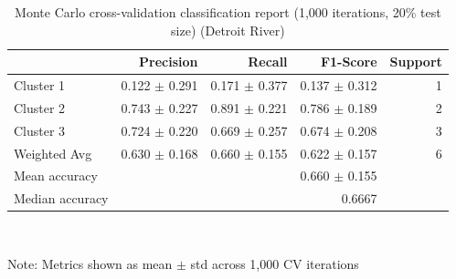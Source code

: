 \begin{table}[htbp]
  \centering
  \caption{Monte Carlo cross-validation classification report (1,000 iterations, 20\% test size) (Detroit River)}
  \label{tab:dr_03_LDA_Classification_mccv_classification_report}
  \begin{tabular}{lrrrr}
    \toprule
     & Precision & Recall & F1-Score & Support \\
    \midrule
    Cluster 1 & 0.122 $\pm$ 0.291 & 0.171 $\pm$ 0.377 & 0.137 $\pm$ 0.312 & 1 \\
    Cluster 2 & 0.743 $\pm$ 0.227 & 0.891 $\pm$ 0.221 & 0.786 $\pm$ 0.189 & 2 \\
    Cluster 3 & 0.724 $\pm$ 0.220 & 0.669 $\pm$ 0.257 & 0.674 $\pm$ 0.208 & 3 \\
    Weighted Avg & 0.630 $\pm$ 0.168 & 0.660 $\pm$ 0.155 & 0.622 $\pm$ 0.157 & 6 \\
    Mean accuracy &  &  & 0.660 $\pm$ 0.155 &  \\
    Median accuracy &  &  & 0.6667 &  \\
    \bottomrule
  \end{tabular}
  \\[4pt]
  \parbox{\textwidth}{\footnotesize Note: Metrics shown as mean $\pm$ std across 1,000 CV iterations}
\end{table}

